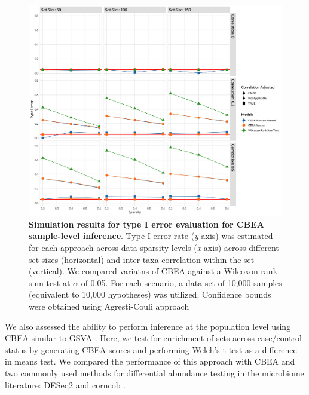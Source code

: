 \documentclass{article}
\begin{document}
\begin{figure}[!h]
    \centering
    \includegraphics[width=\textwidth]{figures/sim_ss_fdr.png}
    \caption{\textbf{Simulation results for type I error evaluation for CBEA sample-level inference}. Type I error rate (\emph{y} axis) was estimated for each approach across data sparsity levels (\emph{x} axis) across different set sizes (horizontal) and inter-taxa correlation within the set (vertical). We compared variatns of CBEA against a Wilcoxon rank sum test at $\alpha$ of 0.05. For each scenario, a data set of 10,000 samples (equivalent to 10,000 hypotheses) was utilized. Confidence bounds were obtained using Agresti-Couli \cite{agresti1998} approach}
    \label{fig:s1}
\end{figure}

We also assessed the ability to perform inference at the population level using CBEA similar to GSVA \cite{hanzelmann2013}. Here, we test for enrichment of sets across case/control status by generating CBEA scores and performing Welch's t-test as a difference in means test. We compared the performance of this approach with CBEA and two commonly used methods for differential abundance testing in the microbiome literature: DESeq2 \cite{love2014} and corncob \cite{martin2020}.   

\end{document}

